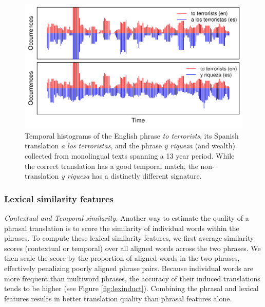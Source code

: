 \documentclass[11pt]{article}
\newcommand{\mtodo}[1]{}
\newcommand{\paraheader}[1]{\vskip 0.05in \noindent\emph{#1}}
\begin{document}
\begin{figure}[t]
\includegraphics[width= \linewidth]{../figures/temporal/temporal}
\caption{Temporal histograms of the English phrase {\em to terrorists}, its Spanish translation {\em a los terroristas}, and the phrase {\em y riqueza} (and wealth) collected from monolingual texts spanning a 13 year period. While the correct translation has a good temporal match, the non-translation {\em y riqueza} has a distinctly different signature.}
\label{fig:temporal}
\end{figure}




\subsubsection{Lexical similarity features}  \label{sect:lexfeats}

\paraheader{Contextual and Temporal similarity.}  Another way to estimate the quality of a phrasal translation is to score the similarity of individual words within the phrases.  To compute these lexical similarity features, we first average similarity scores (contextual or temporal) over all aligned words across the two phrases.  We then scale the score by the proportion of aligned words in the two phrases, effectively penalizing poorly aligned phrase pairs. Because individual words are more frequent than multiword phrases, the accuracy of their induced translations tends to be higher (see Figure \ref{fig:lexinduct}). Combining the phrasal and lexical features results in better translation quality than phrasal features alone. \mtodo{Mention that it is the average of both forward and backward alignments?}
\end{document}
